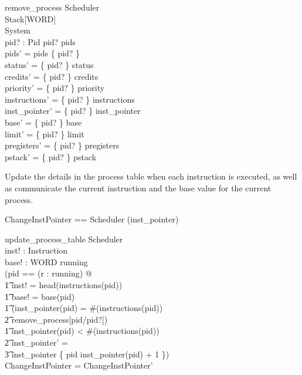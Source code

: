 \documentclass{article}
\begin{document}
\begin{schema}{remove\_process}
  \Delta Scheduler\\
  \Xi Stack[WORD]\\
  \Xi System\\
  pid? : Pid
\where
  pid? \in pids\\
  pids' = pids \setminus \{ pid? \}\\
  status' = \{ pid? \} \ndres status\\
  credits' = \{ pid? \} \ndres credits\\
  priority' = \{ pid? \} \ndres priority\\
  instructions' = \{ pid? \} \ndres instructions\\
  inst\_pointer' = \{ pid? \} \ndres inst\_pointer\\
  base'  = \{ pid? \} \ndres base\\
  limit'  = \{ pid? \} \ndres limit\\
  pregisters' = \{ pid? \} \ndres pregisters\\
  pstack' = \{ pid? \} \ndres pstack
\end{schema}

Update the details in the process table when each instruction is
executed, as well as communicate the current instruction and the base
value for the current process.

\begin{zed}
  ChangeInstPointer == Scheduler \hide (inst\_pointer)
\end{zed}

\begin{schema}{update\_process\_table}
  \Delta Scheduler\\
  inst! : Instruction\\
  base! : WORD
\where
  running \neq \emptyset\\
  (\LET pid == (\mu r : running) @\\
    \t1 inst! = head(instructions(pid)) \land\\
    \t1 base! = base(pid) \land\\
    \t1 (inst\_pointer(pid) = \#(instructions(pid)) \implies\\
      \t2 remove\_process[pid/pid?]) \land\\
    \t1 inst\_pointer(pid) < \#(instructions(pid)) \implies\\
      \t2 inst\_pointer' = \\
        \t3 inst\_pointer \oplus \{ pid \mapsto inst\_pointer(pid) + 1 \})\\
   \theta ChangeInstPointer = \theta ChangeInstPointer'
\end{schema}
\end{document}
